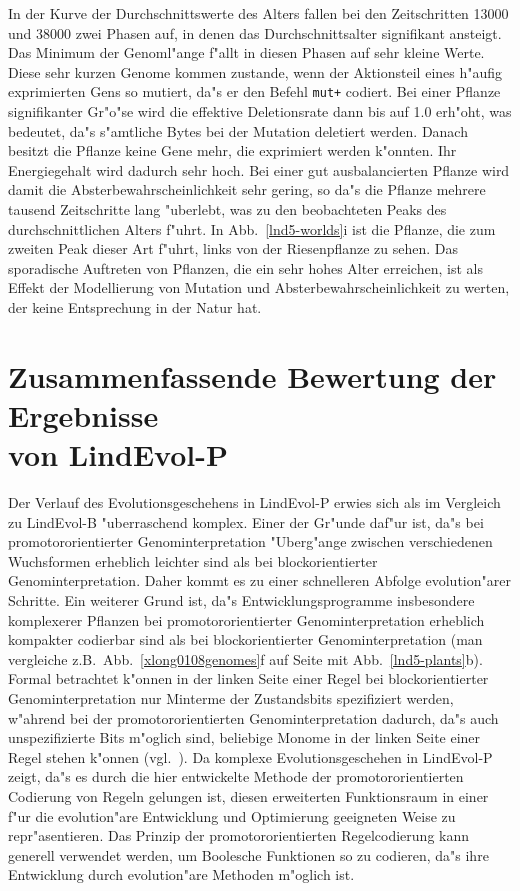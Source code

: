 In der Kurve der Durchschnittswerte des Alters fallen bei den Zeitschritten 13000 und  38000 zwei Phasen auf, in denen das
Durchschnittsalter signifikant ansteigt. Das Minimum der Genoml"ange f"allt in diesen Phasen auf sehr kleine Werte. Diese
sehr kurzen Genome kommen zustande, wenn der Aktionsteil eines h"aufig exprimierten Gens so mutiert, da"s er den Befehl
\verb|mut+| codiert. Bei einer Pflanze signifikanter Gr"o"se wird die effektive Deletionsrate dann bis auf 1.0 erh"oht,
was bedeutet, da"s s"amtliche Bytes bei der Mutation deletiert werden. Danach besitzt die Pflanze keine Gene mehr, die
exprimiert werden k"onnten. Ihr Energiegehalt wird dadurch sehr hoch. Bei einer gut ausbalancierten Pflanze wird damit
die Absterbewahrscheinlichkeit sehr gering, so da"s die Pflanze mehrere tausend Zeitschritte lang "uberlebt, was zu den
beobachteten Peaks des durchschnittlichen Alters f"uhrt. In Abb.\ \ref{lnd5-worlds}i ist die Pflanze, die zum zweiten
Peak dieser Art f"uhrt, links von der Riesenpflanze zu sehen. Das sporadische Auftreten von Pflanzen, die ein sehr hohes
Alter erreichen, ist als Effekt der Modellierung von Mutation und Absterbewahrscheinlichkeit zu werten, der keine
Entsprechung in der Natur hat.


\section[Zusammenfassung]{Zusammenfassende Bewertung der Ergebnisse \\ von LindEvol-P}

Der Verlauf des Evolutionsgeschehens in LindEvol-P erwies sich als im Vergleich zu LindEvol-B "uberraschend komplex.
Einer der Gr"unde daf"ur ist, da"s bei promotororientierter Genominterpretation "Uberg"ange zwischen verschiedenen
Wuchsformen erheblich leichter sind als bei blockorientierter Genominterpretation. Daher kommt es zu einer schnelleren
Abfolge evolution"arer Schritte. Ein weiterer Grund ist, da"s Entwicklungsprogramme insbesondere komplexerer Pflanzen
bei promotororientierter Genominterpretation erheblich kompakter codierbar sind als bei blockorientierter Genominterpretation
(man vergleiche z.B.\ Abb.\ \ref{xlong0108genomes}f auf Seite \pageref{xlong0108genomes} mit Abb.\ \ref{lnd5-plants}b).
Formal betrachtet k"onnen in der linken Seite einer Regel bei blockorientierter Genominterpretation nur Minterme
der Zustandsbits spezifiziert werden, w"ahrend bei der promotororientierten Genominterpretation dadurch, da"s
auch unspezifizierte Bits m"oglich sind, beliebige Monome in der linken Seite einer Regel stehen k"onnen
(vgl.\ \cite{Oberschelp92,Schmidt77}). Da komplexe Evolutionsgeschehen in LindEvol-P zeigt, da"s es durch
die hier entwickelte Methode der promotororientierten Codierung von Regeln gelungen ist, diesen erweiterten Funktionsraum
in einer f"ur die evolution"are Entwicklung und Optimierung geeigneten Weise zu repr"asentieren. Das Prinzip der
promotororientierten Regelcodierung kann generell verwendet werden, um Boolesche Funktionen so zu codieren, da"s
ihre Entwicklung durch evolution"are Methoden m"oglich ist.

